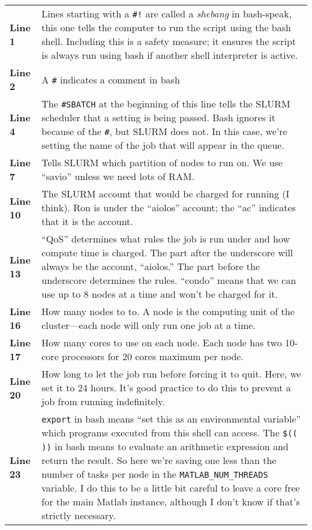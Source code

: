 \documentclass[12pt]{article}
\begin{document}
\bgroup
\def\arraystretch{1.5}
\begin{longtabu}{lX}
	\textbf{Line 1} & Lines starting with a \texttt{\#!} are called a \emph{shebang} in bash-speak, this one tells the computer to run the script using the bash shell.  Including this is a safety measure; it ensures the script is always run using bash if another shell interpreter is active. \\
	\textbf{Line 2} & A \texttt{\#} indicates a comment in bash \\
	\textbf{Line 4} & The \texttt{\#SBATCH} at the beginning of this line tells the SLURM scheduler that a setting is being passed. Bash ignores it because of the \texttt{\#}, but SLURM does not. In this case, we're setting the name of the job that will appear in the queue. \\
	\textbf{Line 7} & Tells SLURM which partition of nodes to run on.  We use ``savio'' unless we need lots of RAM. \\
	\textbf{Line 10} & The SLURM account that would be charged for running (I think). Ron is under the ``aiolos'' account; the ``ac'' indicates that it is the account. \\
	\textbf{Line 13} & ``QoS'' determines what rules the job is run under and how compute time is charged. The part after the underscore will always be the account, ``aiolos.''  The part before the underscore determines the rules. ``condo'' means that we can use up to 8 nodes at a time and won't be charged for it. \\
	\textbf{Line 16} & How many nodes to to. A node is the computing unit of the cluster---each node will only run one job at a time. \\
	\textbf{Line 17} & How many cores to use on each node.  Each node has two 10-core processors for 20 cores maximum per node. \\
	\textbf{Line 20} & How long to let the job run before forcing it to quit.  Here, we set it to 24 hours.  It's good practice to do this to prevent a job from running indefinitely. \\
	\textbf{Line 23} & \texttt{export} in bash means ``set this as an environmental variable'' which programs executed from this shell can access.  The \texttt{\$(( ))} in bash means to evaluate an arithmetic expression and return the result.  So here we're saving one less than the number of tasks per node in the \texttt{MATLAB\_NUM\_THREADS} variable.  I do this to be a little bit careful to leave a core free for the main Matlab instance, although I don't know if that's strictly necessary. \\

\end{longtabu}
\end{document}
